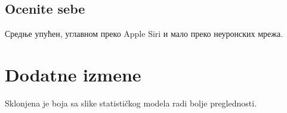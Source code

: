 \documentclass[a4paper]{report}
\begin{document}
\section{Ocenite sebe}
Средње упућен, углавном преко Apple Siri и мало преко неуронских мрежа.

\chapter{Dodatne izmene}
Sklonjena je boja sa slike statističkog modela radi bolje preglednosti.
\end{document}
